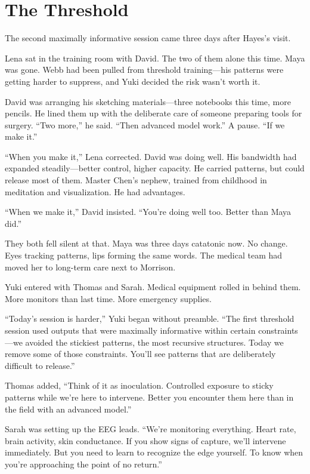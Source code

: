 \chapter{The Threshold}

The second maximally informative session came three days after Hayes's visit.

Lena sat in the training room with David. The two of them alone this time. Maya was gone. Webb had been pulled from threshold training—his patterns were getting harder to suppress, and Yuki decided the risk wasn't worth it.

David was arranging his sketching materials—three notebooks this time, more pencils. He lined them up with the deliberate care of someone preparing tools for surgery. ``Two more,'' he said. ``Then advanced model work.'' A pause. ``If we make it.''

``When you make it,'' Lena corrected. David was doing well. His bandwidth had expanded steadily—better control, higher capacity. He carried patterns, but could release most of them. Master Chen's nephew, trained from childhood in meditation and visualization. He had advantages.

``When we make it,'' David insisted. ``You're doing well too. Better than Maya did.''

They both fell silent at that. Maya was three days catatonic now. No change. Eyes tracking patterns, lips forming the same words. The medical team had moved her to long-term care next to Morrison.

Yuki entered with Thomas and Sarah. Medical equipment rolled in behind them. More monitors than last time. More emergency supplies.

``Today's session is harder,'' Yuki began without preamble. ``The first threshold session used outputs that were maximally informative within certain constraints—we avoided the stickiest patterns, the most recursive structures. Today we remove some of those constraints. You'll see patterns that are deliberately difficult to release.''

Thomas added, ``Think of it as inoculation. Controlled exposure to sticky patterns while we're here to intervene. Better you encounter them here than in the field with an advanced model.''

Sarah was setting up the EEG leads. ``We're monitoring everything. Heart rate, brain activity, skin conductance. If you show signs of capture, we'll intervene immediately. But you need to learn to recognize the edge yourself. To know when you're approaching the point of no return.''

